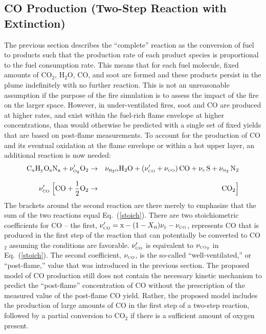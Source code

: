 \subsection{CO Production (Two-Step Reaction with Extinction)}

\label{co_production}

The previous section describes the ``complete'' reaction as the conversion of fuel to
products such that the production rate of each product species is proportional to the fuel consumption rate.
This means that for each fuel molecule, fixed amounts of CO$_2$, H$_2$O, CO, and soot are formed and these products
persist in the plume indefinitely with no further reaction. This is not an unreasonable assumption if
the purpose of the fire simulation is to assess the impact of the fire on the larger space.
However, in under-ventilated fires, soot and CO are produced at higher rates,
and exist within the fuel-rich flame envelope at higher concentrations,
than would otherwise be predicted with a single set of fixed yields that are based on post-flame measurements. To account for the
production of CO and its eventual oxidation at the flame envelope or within a hot upper layer,
an additional reaction is now needed:
\begin{eqnarray}
\mathrm{C_xH_yO_zN_a} +  \nu_{\tiny \hbox{O}_2}' \mathrm{O_2}  &\rightarrow&  \nu_{\tiny \hbox{H}_2\hbox{O}} \mathrm{H_2O} + (\nu_{\tiny \hbox{CO}}'+ \nu_{\tiny \hbox{CO}}) \, \mathrm{CO} +
     \nu_{\tiny \hbox{S}} \, \mathrm{S}  + \nu_{\tiny \hbox{N}_2} \, \mathrm{N_2}   \\*[.1in]
\nu_{\tiny \hbox{CO}}' \; \Big[ \mathrm{CO} + \frac{1}{2} \mathrm{O_2}  &\rightarrow&  \mathrm{CO_2}  \Big]
\label{3reac} \end{eqnarray}
The brackets around the second reaction are there merely to emphasize that the sum of the two reactions equal Eq.~(\ref{stoich}).
There are two stoichiometric coefficients for CO -- the first, $\nu_{\tiny \hbox{CO}}'=\hbox{x}-(1-X_{\tiny \hbox{H}}) \nu_{\tiny \hbox{S}}-\nu_{\tiny \hbox{CO}}$,
represents CO that is produced in the first
step of the reaction that can potentially be converted to CO$_2$ assuming the conditions are favorable. $\nu_{\tiny \hbox{CO}}'$ is equivalent to $\nu_{\tiny \hbox{CO}_2}$ in
Eq.~(\ref{stoich}). The second coefficient, $\nu_{\tiny \hbox{CO}}$,
is the so-called ``well-ventilated,'' or ``post-flame,'' value that was introduced in the previous section. The proposed model of CO production
still does not contain the necessary kinetic mechanism to predict the ``post-flame'' concentration of CO without the prescription of the
measured value of the post-flame CO yield. Rather, the proposed model includes the production of large amounts of CO in the first step of a two-step
reaction, followed by a partial conversion to CO$_2$ if there is a sufficient amount of oxygen present.

